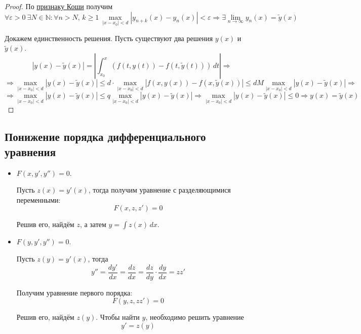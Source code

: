 \begin{proof}
По \hyperref[th:Cauchy_criterion]{признаку Коши} получим
\begin{equation*}
\forall \varepsilon > 0 \ \exists N \in \mathbb N \colon \forall n > N,\, k \geqslant 1 \
\max_{|x - x_0| < d} |y_{n+k}(x) - y_n(x)| < \varepsilon \Rightarrow
\exists \lim_{n \to \infty} y_n(x) = \tilde y(x)
\end{equation*}

Докажем единственность решения.
Пусть существуют два решения $y(x)$ и $\tilde y(x)$.
\begin{equation*}
|y(x) - \tilde y(x)| =
\left| \int_{x_0}^x (f(t, y(t)) - f(t, \tilde y(t)))\,dt \right| \Rightarrow
\end{equation*}
\begin{equation*}
\Rightarrow \max_{|x - x_0| < d} |y(x) - \tilde y(x)| \leqslant
d \cdot \max_{|x - x_0| < d} |f(x, y(x)) - f(x, \tilde y(x))| \leqslant
d M \max_{|x - x_0| < d} |y(x) - \tilde y(x)| \Rightarrow
\end{equation*}
\begin{equation*}
\Rightarrow \max_{|x - x_0| < d} |y(x) - \tilde y(x)| \leqslant q \max_{|x - x_0| < d} |y(x) - \tilde y(x)| \Rightarrow
\max_{|x - x_0| < d} |y(x) - \tilde y(x)| \leqslant 0 \Rightarrow
y(x) = \tilde y(x)
\end{equation*}
\end{proof}

\subsection{Понижение порядка дифференциального уравнения}
\begin{itemize}
	\item $F(x, y', y'') = 0$.
	
	Пусть $z(x) = y'(x)$, тогда получим уравнение с разделяющимися переменными:
	\begin{equation*}
	F(x, z, z') = 0
	\end{equation*}
	
	Решив его, найдём $z$, а затем $y = \int z(x)\,dx$.
	
	\item $F(y, y', y'') = 0$.
	
	Пусть $z(y) = y'(x)$, тогда
	\begin{equation*}
	y'' = \frac{dy'}{dx} =
	\frac{dz}{dx} =
	\frac{dz}{dy} \cdot \frac{dy}{dx} =
	z z'
	\end{equation*}
	
	Получим уравнение первого порядка:
	\begin{equation*}
	F(y, z, z z') = 0
	\end{equation*}
	
	Решив его, найдём $z(y)$.
	Чтобы найти $y$, необходимо решить уравнение
	\begin{equation*}
	y' = z(y)
	\end{equation*}
\end{itemize}